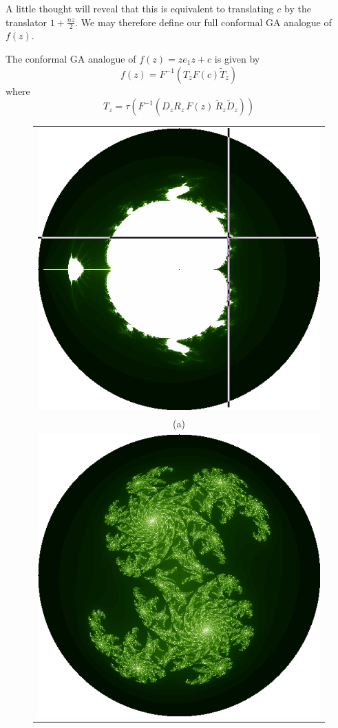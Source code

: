 A little thought will reveal that this is equivalent to translating $c$ by the translator
$1 + \frac{nz}{2}$. We may therefore define our full conformal GA analogue of $f(z)$.

\begin{definition}
The conformal GA analogue of $f(z) = ze_1z + c$ is given by
\[
f(z) = F^{-1}(T_z F(c) \tilde{T}_z)
\]
where
\[
T_z = \tau(F^{-1}(D_z R_z\,F(z)\,\tilde{R}_z \tilde{D}_z))
\]
\end{definition}

\begin{figure}[p]
\centering
\begin{tabular}{c}
\includegraphics[width=0.35\textheight]{hyp_mandel_julia_pos} \\ (a) \\
\includegraphics[width=0.35\textheight]{julia_hyp} \\

\end{tabular}
\end{figure}
